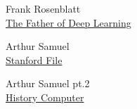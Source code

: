 \documentclass{article}
\begin{document}
    \newpage

    \begin{thebibliography}{3}
        Frank Rosenblatt \\
        \href{http://www.csis.pace.edu/~ctappert/srd/b1.pdf}{The Father of Deep Learning} 
        
        Arthur Samuel \\
        \href{https://cs.stanford.edu/memoriam/professor-arthur-samuel}{Stanford  File} 
    
        Arthur Samuel pt.2 \\
        \href{https://history-computer.com/ModernComputer/thinkers/Samuel.html}{History Computer} 
    \end{thebibliography}
    
\end{document}
